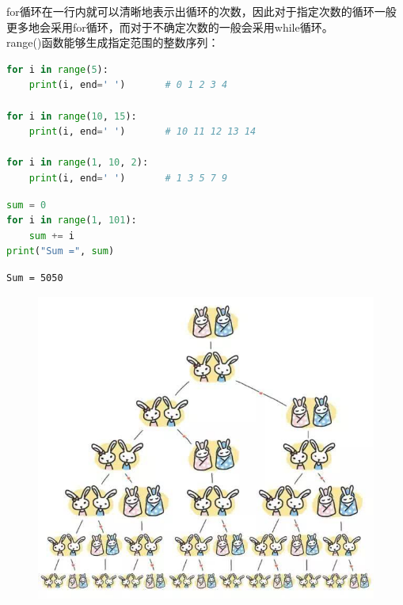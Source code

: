 for循环在一行内就可以清晰地表示出循环的次数，因此对于指定次数的循环一般更多地会采用for循环，而对于不确定次数的一般会采用while循环。\\

range()函数能够生成指定范围的整数序列：

\vspace{-0.5cm}

\begin{lstlisting}[language=Python]
for i in range(5):
    print(i, end=' ')		# 0 1 2 3 4

for i in range(10, 15):
	print(i, end=' ')		# 10 11 12 13 14

for i in range(1, 10, 2):
	print(i, end=' ')		# 1 3 5 7 9
\end{lstlisting}

\vspace{0.5cm}


\begin{lstlisting}[language=Python]
sum = 0
for i in range(1, 101):
	sum += i
print("Sum =", sum)
\end{lstlisting}

\begin{tcolorbox}
	\begin{verbatim}
Sum = 5050
\end{verbatim}
\end{tcolorbox}

\vspace{0.5cm}


\begin{figure}[H]
	\centering
	\includegraphics[scale=0.5]{img/Chapter3/3-2/1.png}
\end{figure}

